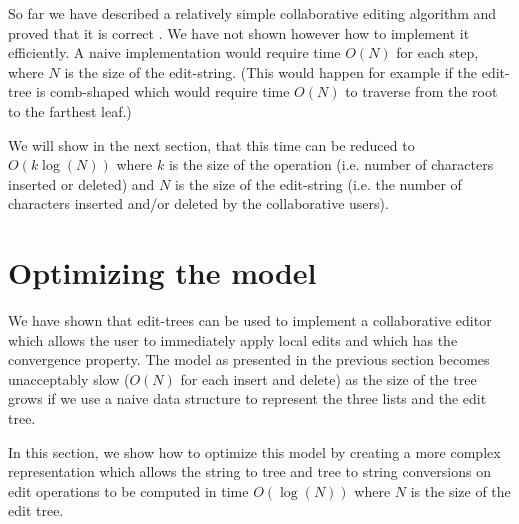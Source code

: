 \documentclass{amsart}
\begin{document}
So far we have described a relatively simple collaborative editing algorithm and
proved that it is correct . We have not shown however how
to implement it efficiently. A naive implementation would require time $O(N)$ for
each step, where $N$ is the size of the edit-string. (This would happen
for example if the edit-tree is comb-shaped which would require time $O(N)$
to traverse from the root to the farthest leaf.)

We will show in the 
next section, that this time can be reduced to $O(k\log(N))$ where $k$ is the
size of the operation (i.e. number of characters inserted or deleted) and
$N$ is the size of the edit-string (i.e. the number of characters inserted
and/or deleted by the collaborative users).


\section{Optimizing the model}

We have shown that edit-trees can be used to implement a collaborative editor
which allows the user to immediately apply local edits and which has the convergence
property.  The model as presented in the previous section becomes unacceptably slow ($O(N)$ for each insert and delete) as the size of the tree grows if we use a naive data structure to represent the three lists and the edit tree.  

In this section, we show how to optimize this model by creating a more complex representation which allows
the string to tree and tree to string conversions on edit operations to be computed
in time $O(\log(N))$ where $N$ is the size of the edit tree.
\end{document}
